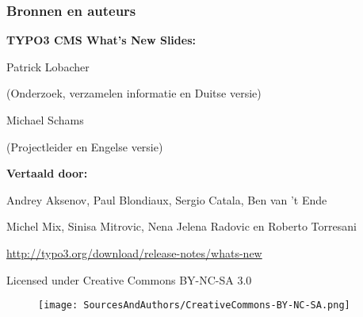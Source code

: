\begin{frame}[fragile]
	\frametitle{Bronnen en auteurs}

	\vspace{-0.6cm}

	\centerline{\textbf{TYPO3 CMS What's New Slides:}}

	\begin{center}
		\smaller
			\centerline{Patrick Lobacher}
			\centerline{(Onderzoek, verzamelen informatie en Duitse versie)}
			\vspace{0.1cm}
			\centerline{Michael Schams}
			\centerline{(Projectleider en Engelse versie)}
		\normalsize
	\end{center}
	\vspace{-0.6cm}
	\begin{center}
		\smaller
			\centerline{\textbf{Vertaald door:}}
			\centerline{Andrey Aksenov, Paul Blondiaux, Sergio Catala, Ben van 't Ende}
			\centerline{Michel Mix, Sinisa Mitrovic, Nena Jelena Radovic en Roberto Torresani}
		\normalsize
	\end{center}
	\vspace{-0.6cm}
	\smaller\begin{center}\url{http://typo3.org/download/release-notes/whats-new}\end{center}\normalsize

	\smaller\begin{center}Licensed under Creative Commons BY-NC-SA 3.0\end{center}\normalsize
	\begin{figure}\vspace*{-0.3cm}
		\texttt{[image: SourcesAndAuthors/CreativeCommons-BY-NC-SA.png]}
	\end{figure}

\end{frame}

